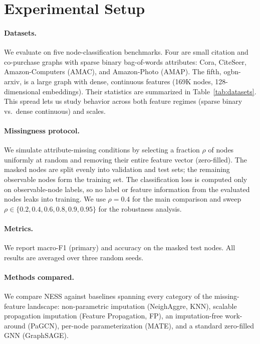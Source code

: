 \section{Experimental Setup}
\label{sec:setup}

\paragraph{Datasets.} We evaluate on five node-classification benchmarks. Four are small citation and co-purchase graphs with sparse binary bag-of-words attributes: Cora, CiteSeer, Amazon-Computers (AMAC), and Amazon-Photo (AMAP). The fifth, ogbn-arxiv, is a large graph with dense, continuous features (169K nodes, 128-dimensional embeddings). Their statistics are summarized in Table~\ref{tab:datasets}. This spread lets us study behavior across both feature regimes (sparse binary vs.\ dense continuous) and scales.

\paragraph{Missingness protocol.} We simulate attribute-missing conditions by selecting a fraction $\rho$ of nodes uniformly at random and removing their entire feature vector (zero-filled). The masked nodes are split evenly into validation and test sets; the remaining observable nodes form the training set. The classification loss is computed only on observable-node labels, so no label or feature information from the evaluated nodes leaks into training. We use $\rho=0.4$ for the main comparison and sweep $\rho \in \{0.2,0.4,0.6,0.8,0.9,0.95\}$ for the robustness analysis.

\paragraph{Metrics.} We report macro-F1 (primary) and accuracy on the masked test nodes. All results are averaged over three random seeds.

\paragraph{Methods compared.} We compare NESS against baselines spanning every category of the missing-feature landscape: non-parametric imputation (NeighAggre, KNN), scalable propagation imputation (Feature Propagation, FP), an imputation-free work-around (PaGCN), per-node parameterization (MATE), and a standard zero-filled GNN (GraphSAGE).

